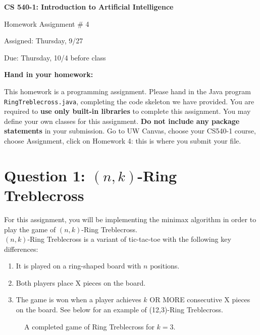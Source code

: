 \documentclass[10pt,a4paper]{article}
\begin{document}
\begin{center}
{\bf \large CS 540-1: Introduction to Artificial Intelligence

Homework Assignment \# 4

\vspace{0.5cm}

Assigned:  Thursday, 9/27  

Due:  Thursday, 10/4 before class} 
\end{center}

\vspace{1cm}

\begin{center}
{\bf \Large Hand in your homework:}
\end{center}


This homework is a programming assignment. Please hand in the Java program
\texttt{RingTreblecross.java}, completing the code skeleton we have provided. You
are required to \textbf{use only built-in libraries} to complete this
assignment. You may define your own classes for this assignment. \textbf{Do not
  include any package statements} in your submission. Go to UW Canvas, choose
your CS540-1 course, choose Assignment, click on Homework 4: this is where you
submit your file.

\section*{Question 1: $(n,k)$-Ring Treblecross}
For this assignment, you will be implementing the minimax algorithm in order to
play the game of $(n,k)$-Ring Treblecross.\\

$(n,k)$-Ring Treblecross is a variant of tic-tac-toe with the following key differences:
\begin{enumerate}
\item It is played on a ring-shaped board with $n$ positions.
\item Both players place X pieces on the board.
\item The game is won when a player achieves $k$ OR MORE consecutive X pieces on the
  board. See below for an example of (12,3)-Ring Treblecross.
\end{enumerate}

\begin{figure}[h]
	\centering
	\caption{A completed game of Ring Treblecross for $k = 3$.}
	\label{fig:fig1}
\end{figure}
\end{document}
